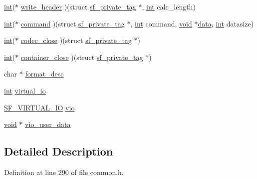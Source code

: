 \begin{DoxyCompactItemize}
\item 
\hyperlink{xmltok_8h_a5a0d4a5641ce434f1d23533f2b2e6653}{int}($\ast$ \hyperlink{structsf__private__tag_a41db5f9e03f8f5ab24bce4534b3c1c98}{write\+\_\+header} )(struct \hyperlink{structsf__private__tag}{sf\+\_\+private\+\_\+tag} $\ast$, \hyperlink{xmltok_8h_a5a0d4a5641ce434f1d23533f2b2e6653}{int} calc\+\_\+length)
\item 
\hyperlink{xmltok_8h_a5a0d4a5641ce434f1d23533f2b2e6653}{int}($\ast$ \hyperlink{structsf__private__tag_a7303acd2f12402fa584c71e54395da28}{command} )(struct \hyperlink{structsf__private__tag}{sf\+\_\+private\+\_\+tag} $\ast$, \hyperlink{xmltok_8h_a5a0d4a5641ce434f1d23533f2b2e6653}{int} command, \hyperlink{sound_8c_ae35f5844602719cf66324f4de2a658b3}{void} $\ast$\hyperlink{lib_2expat_8h_ac39e72a1de1cb50dbdc54b08d0432a24}{data}, \hyperlink{xmltok_8h_a5a0d4a5641ce434f1d23533f2b2e6653}{int} datasize)
\item 
\hyperlink{xmltok_8h_a5a0d4a5641ce434f1d23533f2b2e6653}{int}($\ast$ \hyperlink{structsf__private__tag_aa91db70373a3fdbedf87d0dc17750045}{codec\+\_\+close} )(struct \hyperlink{structsf__private__tag}{sf\+\_\+private\+\_\+tag} $\ast$)
\item 
\hyperlink{xmltok_8h_a5a0d4a5641ce434f1d23533f2b2e6653}{int}($\ast$ \hyperlink{structsf__private__tag_af651f92f5e5c247a4f0d11fbc9b5c9c1}{container\+\_\+close} )(struct \hyperlink{structsf__private__tag}{sf\+\_\+private\+\_\+tag} $\ast$)
\item 
char $\ast$ \hyperlink{structsf__private__tag_aef35e722baee8cdfb2eac1c3417464eb}{format\+\_\+desc}
\item 
\hyperlink{xmltok_8h_a5a0d4a5641ce434f1d23533f2b2e6653}{int} \hyperlink{structsf__private__tag_a0933fd00609c79f4def51274ca272071}{virtual\+\_\+io}
\item 
\hyperlink{struct_s_f___v_i_r_t_u_a_l___i_o}{S\+F\+\_\+\+V\+I\+R\+T\+U\+A\+L\+\_\+\+IO} \hyperlink{structsf__private__tag_a6de4eff0a4fa2a9b06de7ade18c66297}{vio}
\item 
\hyperlink{sound_8c_ae35f5844602719cf66324f4de2a658b3}{void} $\ast$ \hyperlink{structsf__private__tag_a1785d318b54a69a341897f193c5f09da}{vio\+\_\+user\+\_\+data}
\end{DoxyCompactItemize}


\subsection{Detailed Description}


Definition at line 290 of file common.\+h.




